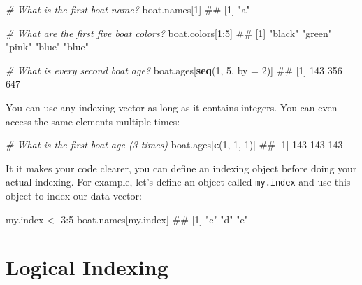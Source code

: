\documentclass[]{book}
\newenvironment{Shaded}{\begin{snugshade}}{\end{snugshade}}
\newcommand{\KeywordTok}[1]{\textcolor[rgb]{0.13,0.29,0.53}{\textbf{{#1}}}}
\newcommand{\DataTypeTok}[1]{\textcolor[rgb]{0.13,0.29,0.53}{{#1}}}
\newcommand{\DecValTok}[1]{\textcolor[rgb]{0.00,0.00,0.81}{{#1}}}
\newcommand{\StringTok}[1]{\textcolor[rgb]{0.31,0.60,0.02}{{#1}}}
\newcommand{\CommentTok}[1]{\textcolor[rgb]{0.56,0.35,0.01}{\textit{{#1}}}}
\newcommand{\NormalTok}[1]{{#1}}
\theoremstyle{definition}
\theoremstyle{definition}
\theoremstyle{remark}
\begin{document}
\begin{Shaded}
\begin{Highlighting}[]
\CommentTok{# What is the first boat name?}
\NormalTok{boat.names[}\DecValTok{1}\NormalTok{]}
\NormalTok{## [1] "a"}

\CommentTok{# What are the first five boat colors?}
\NormalTok{boat.colors[}\DecValTok{1}\NormalTok{:}\DecValTok{5}\NormalTok{]}
\NormalTok{## [1] "black" "green" "pink"  "blue"  "blue"}

\CommentTok{# What is every second boat age?}
\NormalTok{boat.ages[}\KeywordTok{seq}\NormalTok{(}\DecValTok{1}\NormalTok{, }\DecValTok{5}\NormalTok{, }\DataTypeTok{by =} \DecValTok{2}\NormalTok{)]}
\NormalTok{## [1] 143 356 647}
\end{Highlighting}
\end{Shaded}

You can use any indexing vector as long as it contains integers. You can
even access the same elements multiple times:

\begin{Shaded}
\begin{Highlighting}[]
\CommentTok{# What is the first boat age (3 times)}
\NormalTok{boat.ages[}\KeywordTok{c}\NormalTok{(}\DecValTok{1}\NormalTok{, }\DecValTok{1}\NormalTok{, }\DecValTok{1}\NormalTok{)]}
\NormalTok{## [1] 143 143 143}
\end{Highlighting}
\end{Shaded}

It it makes your code clearer, you can define an indexing object before
doing your actual indexing. For example, let's define an object called
\texttt{my.index} and use this object to index our data vector:

\begin{Shaded}
\begin{Highlighting}[]
\NormalTok{my.index <-}\StringTok{ }\DecValTok{3}\NormalTok{:}\DecValTok{5}
\NormalTok{boat.names[my.index]}
\NormalTok{## [1] "c" "d" "e"}
\end{Highlighting}
\end{Shaded}

\section{Logical Indexing}\label{logical-indexing}
\end{document}
